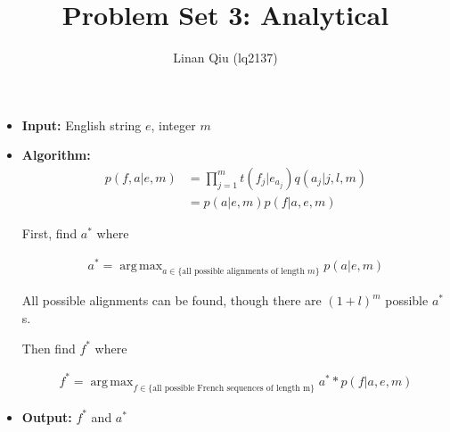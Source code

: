 \documentclass[11pt]{scrartcl}
\title{Problem Set 3: Analytical}
\author{Linan Qiu (lq2137)}
\DeclareMathOperator*{\argmax}{arg\,max}
\begin{document}
\maketitle

\section{}
\subsection{}

\begin{itemize}
\item \textbf{Input:} English string $e$, integer $m$
\item \textbf{Algorithm:}
\begin{align*}
p(f, a | e, m) &= \prod^m_{j=1} t(f_j | e_{a_j}) q(a_j | j, l, m) \\ 
&= p(a | e, m) p(f| a, e, m)
\end{align*}

First, find $a^*$ where

\begin{align*}
a^* = \argmax_{a \in \{\text{all possible alignments of length } m\}} p(a|e,m)
\end{align*}

All possible alignments can be found, though there are $(1+l)^m$ possible $a^*$s. 

Then find $f^*$ where

\begin{align*}
f^* = \argmax_{f \in \{\text{all possible French sequences of length m}\}} a^* * p(f|a,e,m)
\end{align*}
\item \textbf{Output:} $f^*$ and $a^*$
\end{itemize}

\subsection{}
\end{document}
